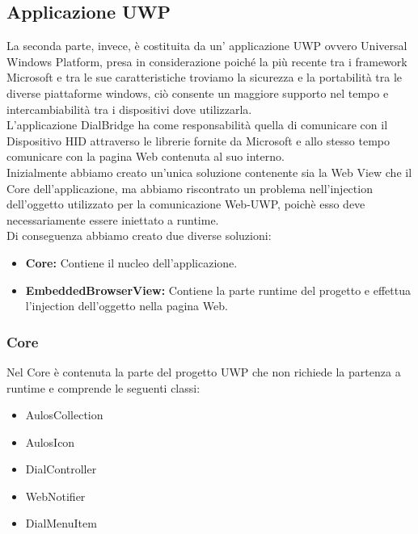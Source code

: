\subsection{Applicazione UWP}

La seconda parte, invece, è costituita da un’ applicazione UWP ovvero Universal Windows Platform, presa in considerazione poiché la più recente tra i framework Microsoft e tra le sue caratteristiche troviamo la sicurezza e la portabilità tra le diverse piattaforme windows, ciò consente un maggiore supporto nel tempo e intercambiabilità tra i dispositivi dove utilizzarla.\\

L’applicazione DialBridge ha come responsabilità quella di comunicare con il Dispositivo HID attraverso le librerie fornite da Microsoft e allo stesso tempo comunicare con la pagina Web contenuta al suo interno.\\

Inizialmente abbiamo creato un’unica soluzione contenente sia la Web View che il Core dell’applicazione, ma abbiamo riscontrato un problema nell’injection dell’oggetto utilizzato per la comunicazione Web-UWP, poichè esso deve necessariamente essere iniettato a runtime.\\

Di conseguenza abbiamo creato due diverse soluzioni:

\begin{itemize}
\item \textbf{Core:} Contiene il nucleo dell’applicazione.
\item \textbf{EmbeddedBrowserView:} Contiene la parte runtime del progetto e effettua l’injection dell’oggetto nella pagina Web.
\end{itemize}

\subsubsection{Core}

Nel Core è contenuta la parte del progetto UWP che non richiede la partenza a runtime e comprende le seguenti classi:

\begin{itemize}
\item AulosCollection
\item AulosIcon
\item DialController
\item WebNotifier
\item DialMenuItem
\end{itemize}

